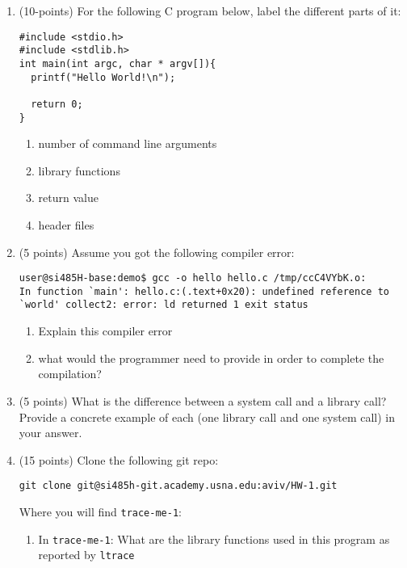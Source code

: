\documentclass{article}[9pt]
\begin{document}
\begin{enumerate}
\item (10-points) For the following C program below, label the different parts of it:
\begin{verbatim}
#include <stdio.h>
#include <stdlib.h>
int main(int argc, char * argv[]){
  printf("Hello World!\n");

  return 0;
}
\end{verbatim}
\begin{enumerate}
\item number of command line arguments

\item library functions

\item return value

\item header files
\end{enumerate}

\item (5 points) Assume you got the following compiler error:
\begin{verbatim}
user@si485H-base:demo$ gcc -o hello hello.c /tmp/ccC4VYbK.o:
In function `main': hello.c:(.text+0x20): undefined reference to `world' collect2: error: ld returned 1 exit status
\end{verbatim}

\begin{enumerate}
\item Explain this compiler error

\item what would the programmer need to provide in order to complete the compilation?
\end{enumerate}

\item (5 points) What is the difference between a system call and a library call?
Provide a concrete example of each (one library call and one
system call) in your answer.

\item (15 points) Clone the following git repo:
\begin{verbatim}
git clone git@si485h-git.academy.usna.edu:aviv/HW-1.git
\end{verbatim}
Where you will find \texttt{trace-me-1}:

\begin{enumerate}
\item In \texttt{trace-me-1}: What are the library functions used in this program as reported by \texttt{ltrace}


\end{enumerate}
\end{enumerate}
\end{document}
